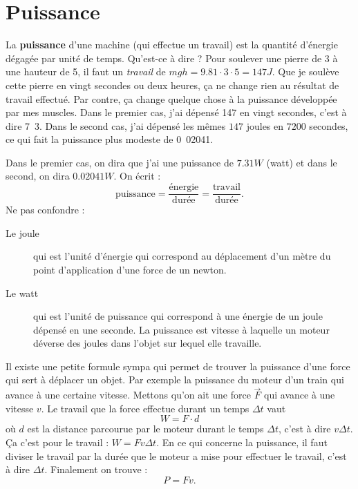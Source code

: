 \documentclass[a4paper,12pt]{book}
\theoremstyle{mes_exemples}	\newtheorem{exemple}[numtho]{Exemple}
\theoremstyle{mes_tho}
\newcommand{\defe}[2]{\textbf{#1}\index{#2}}
\newcommand{\fF}{\overrightarrow{F}}
\begin{document}
\section{Puissance}

La \defe{puissance}{Puissance} d'une machine (qui effectue un travail) est la quantité d'énergie dégagée par unité de temps. Qu'est-ce à dire ? Pour soulever une pierre de \unit{3}{\kilogram} à une hauteur de \unit{5}{\meter}, il faut un \emph{travail} de $mgh=9.81\cdot 3\cdot 5=147 J$. Que je soulève cette pierre en vingt secondes ou deux heures, ça ne change rien au résultat de travail effectué. Par contre, ça change quelque chose à la puissance développée par mes muscles. Dans le premier cas, j'ai dépensé \unit{147}{\joule}    en vingt secondes, c'est à dire \unit{7.3}{\joule\per\second}. Dans le second cas, j'ai dépensé les mêmes $147$ joules en $7200$ secondes, ce qui fait la puissance plus modeste de \unit{0.02041}{\joule\per\second}.

Dans le premier cas, on dira que j'ai une puissance de $7.31W$ (watt) et dans le second, on dira $0.02041W$. On écrit :
\[
 \text{puissance}=\frac{\text{énergie}}{\text{durée}}=\frac{\text{travail}}{\text{durée}}.
\]
Ne pas confondre :
\begin{description}
\item[Le joule] qui est l'unité d'énergie qui correspond au déplacement d'un mètre du point d'application d'une force de un newton.
\item[Le watt] qui est l'unité de puissance qui correspond à une énergie de un joule dépensé en une seconde. La puissance est vitesse à laquelle un moteur déverse des joules dans l'objet sur lequel elle travaille.
\end{description}

Il existe une petite formule sympa qui permet de trouver la puissance d'une force qui sert à déplacer un objet. Par exemple la puissance du moteur d'un train qui avance à une certaine vitesse. Mettons qu'on ait une force $\fF$ qui avance à une vitesse $v$. Le travail que la force effectue durant un temps $\Delta t$ vaut 
\[ 
 W=F\cdot d 
\]
où $d$ est la distance parcourue par le moteur durant le temps $\Delta t$, c'est à dire $v\Delta t$. Ça c'est pour le travail : $W=Fv\Delta t$. En ce qui concerne la puissance, il faut diviser le travail par la durée que le moteur a mise pour effectuer le travail, c'est à dire $\Delta t$. Finalement on trouve :
\begin{equation} \label{eq_puissFv}
  P=Fv.
\end{equation}
\end{document}
